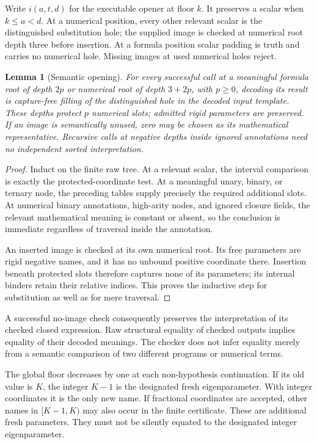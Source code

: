 \documentclass[11pt,letterpaper]{article}
\newtheorem{lemma}[theorem]{Lemma}
\theoremstyle{definition}
\begin{document}
Write $i(a,t,d)$ for the executable opener at floor $k$.  It preserves a
scalar when $k\leq a<d$.  At a numerical position, every other relevant
scalar is the distinguished substitution hole; the supplied image is
checked at numerical root depth three before insertion.  At a formula
position scalar padding is truth and carries no numerical hole.
Missing images at used numerical holes reject.

\begin{lemma}[Semantic opening]
\label{lem:semantic-opening}
For every successful call at a meaningful formula root of depth $2p$
or numerical root of depth $3+2p$, with $p\geq0$, decoding its result
is capture-free filling of the distinguished hole in the decoded input
template.  These depths protect $p$ numerical slots; admitted rigid
parameters are preserved.  If an image is semantically unused, zero
may be chosen as its mathematical representative.  Recursive calls
at negative depths inside ignored annotations need no independent
sorted interpretation.
\end{lemma}

\begin{proof}
Induct on the finite raw tree.  At a relevant scalar, the interval
comparison is exactly the protected-coordinate test.  At a meaningful
unary, binary, or ternary node, the preceding tables supply precisely
the required additional slots.  At numerical binary annotations,
high-arity nodes, and ignored closure fields, the relevant mathematical
meaning is constant or absent, so the conclusion is immediate
regardless of traversal inside the annotation.

An inserted image is checked at its own numerical root.  Its free
parameters are rigid negative names, and it has no unbound positive
coordinate there.  Insertion beneath protected slots therefore captures
none of its parameters; its internal binders retain their relative
indices.  This proves the inductive step for substitution as well as
for mere traversal.
\end{proof}

A successful no-image check consequently preserves the interpretation
of its checked closed expression.  Raw structural equality of checked
outputs implies equality of their decoded meanings.  The checker does
not infer equality merely from a semantic comparison of two different
programs or numerical terms.

The global floor decreases by one at each non-hypothesis continuation.
If its old value is $K$, the integer $K-1$ is the designated fresh
eigenparameter.  With integer coordinates it is the only new name.
If fractional coordinates are accepted, other names in $[K-1,K)$ may
also occur in the finite certificate.  These are additional fresh
parameters.  They must not be silently equated to the designated
integer eigenparameter.
\end{document}
